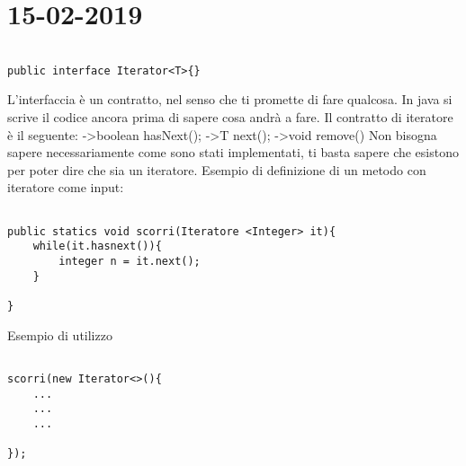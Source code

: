 

\newpage
\section{15-02-2019}
\par

\begin{lstlisting}[basicstyle=\small,]

public interface Iterator<T>{}

\end{lstlisting}

L'interfaccia è un contratto, nel senso che ti promette di fare qualcosa. \newline
In java si scrive il codice ancora prima di sapere cosa andrà a fare. \newline
Il contratto di iteratore è il seguente: \newline
->boolean hasNext(); \newline
->T next(); \newline
->void remove()\newline
Non bisogna sapere necessariamente come sono stati implementati, ti basta sapere che esistono per poter dire che sia un iteratore. \newline
Esempio di definizione di un metodo con iteratore come input: 

\begin{lstlisting}[basicstyle=\small,]

public statics void scorri(Iteratore <Integer> it){
	while(it.hasnext()){
		integer n = it.next();
	}

}

\end{lstlisting}

Esempio di utilizzo 

\begin{lstlisting}[basicstyle=\small,]

scorri(new Iterator<>(){
	...
	...
	...

});

\end{lstlisting}

